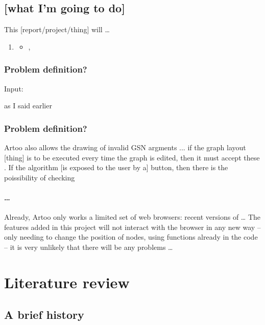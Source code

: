\documentclass[authoryearcitations]{UoYCSproject}
\begin{document}

\section{[what I'm going to do]}

This [report/project/thing] will \ldots

    \begin{enumerate}
        \item \begin{itemize}
            \item ,
        \end{itemize}
    \end{enumerate}

\subsection{Problem definition?}

Input:

as I said earlier

\subsection{Problem definition?}

Artoo also allows the drawing of invalid GSN argments ...
if the graph layout [thing] is to be executed every time the graph is edited, then it must accept these .
If the algorithm [is exposed to the user by a] button, then there is the poissibility of checking 

\subsubsection{\ldots}

Already, Artoo only works a limited set of web browsers: recent versions of \ldots
The features added in this project will not interact with the browser in any new way -- only needing to change the position of nodes, using functions already in the code -- it is very unlikely that there will be any problems \ldots



\chapter{Literature review}

\section{A brief history}
\end{document}
